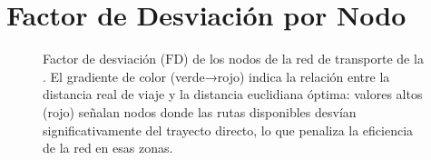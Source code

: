 \section{Factor de Desviación por Nodo}
\label{anx:mapa-factor-desviacion}

\begin{figure}[p]
  \centering
  \caption[Factor de desviación por nodo (alta resolución)]{Factor de desviación ($\text{FD}$) de los nodos de la red
    de transporte de la \zmvm{}. El gradiente de color (verde→rojo) indica la relación entre la distancia real de viaje
    y la distancia euclidiana óptima: valores altos (rojo) señalan nodos donde las rutas disponibles desvían significativamente
    del trayecto directo, lo que penaliza la eficiencia de la red en esas zonas.\DIFdelbeginFL %
\DIFdelendFL }
  \label{fig:anx-mapa-factor-desviacion}
  \DIFaddbeginFL {}
\DIFaddendFL \end{figure}
